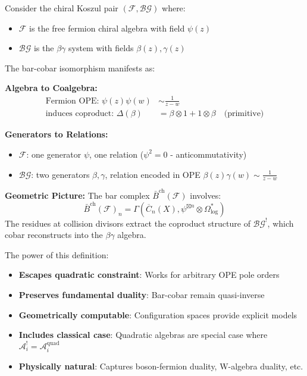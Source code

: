 \begin{example}
Consider the chiral Koszul pair $(\mathcal{F}, \mathcal{BG})$ where:
\begin{itemize}
\item $\mathcal{F}$ is the free fermion chiral algebra with field $\psi(z)$
\item $\mathcal{BG}$ is the $\beta\gamma$ system with fields $\beta(z), \gamma(z)$
\end{itemize}

The bar-cobar isomorphism manifests as:

\textbf{Algebra to Coalgebra:}
\begin{align*}
\text{Fermion OPE: } \psi(z)\psi(w) &\sim \frac{1}{z-w} \\
\text{induces coproduct: } \Delta(\beta) &= \beta \otimes 1 + 1 \otimes \beta \quad \text{(primitive)}
\end{align*}

\textbf{Generators to Relations:}
\begin{itemize}
\item $\mathcal{F}$: one generator $\psi$, one relation ($\psi^2 = 0$ - anticommutativity)
\item $\mathcal{BG}$: two generators $\beta, \gamma$, relation encoded in OPE $\beta(z)\gamma(w) \sim \frac{1}{z-w}$
\end{itemize}

\textbf{Geometric Picture:}
The bar complex $\bar{B}^{\text{ch}}(\mathcal{F})$ involves:
$$\bar{B}^{\text{ch}}(\mathcal{F})_n = \Gamma\left(\overline{C}_n(X), \psi^{\boxtimes n} \otimes \Omega^*_{\log}\right)$$
The residues at collision divisors extract the coproduct structure of $\mathcal{BG}^!$, which cobar reconstructs into the $\beta\gamma$ algebra.
\end{example}

\begin{remark}
The power of this definition:
\begin{itemize}
\item \textbf{Escapes quadratic constraint}: Works for arbitrary OPE pole orders
\item \textbf{Preserves fundamental duality}: Bar-cobar remain quasi-inverse
\item \textbf{Geometrically computable}: Configuration spaces provide explicit models
\item \textbf{Includes classical case}: Quadratic algebras are special case where $\mathcal{A}_i^! = \mathcal{A}_i^{\text{quad}}$
\item \textbf{Physically natural}: Captures boson-fermion duality, W-algebra duality, etc.
\end{itemize}
\end{remark}

